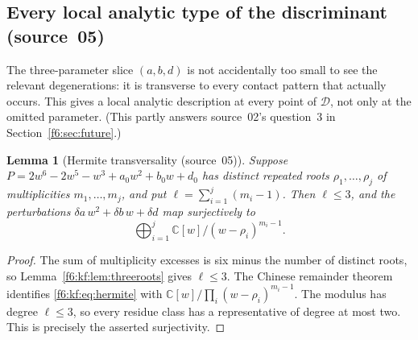 \documentclass[11pt,a4paper]{article}
\newtheorem{lemma}[theorem]{Lemma}
\theoremstyle{definition}
\newcommand{\C}{\mathbb C}
\newcommand{\dd}{\mathcal D}
\newcommand{\src}[1]{\textup{(source~#1)}}
\begin{document}
\subsection{Every local analytic type of the discriminant \src{05}}
\label{f6:kf:sec:local}
The three-parameter slice $(a,b,d)$ is not accidentally too small to see the
relevant degenerations: it is transverse to every contact pattern that
actually occurs. This gives a local analytic description at every point of
$\dd$, not only at the omitted parameter. (This partly answers source~02's
question~3 in Section~\ref{f6:sec:future}.)

\begin{lemma}[Hermite transversality \src{05}]\label{f6:kf:lem:hermite}
Suppose $P=2w^6-2w^5-w^3+a_0w^2+b_0w+d_0$ has distinct repeated roots
$\rho_1,\dots,\rho_j$ of multiplicities $m_1,\dots,m_j$, and put
$\ell=\sum_{i=1}^j(m_i-1)$. Then $\ell\le3$, and the perturbations
$\delta a\,w^2+\delta b\,w+\delta d$ map surjectively to
\begin{equation}\label{f6:kf:eq:hermite}
\bigoplus_{i=1}^j\C[w]/(w-\rho_i)^{m_i-1}.
\end{equation}
\end{lemma}
\begin{proof}
The sum of multiplicity excesses is six minus the number of distinct roots,
so Lemma~\ref{f6:kf:lem:threeroots} gives $\ell\le3$. The Chinese remainder
theorem identifies \eqref{f6:kf:eq:hermite} with
$\C[w]/\prod_i(w-\rho_i)^{m_i-1}$. The modulus has degree $\ell\le3$, so
every residue class has a representative of degree at most two. This is
precisely the asserted surjectivity.
\end{proof}
\end{document}
